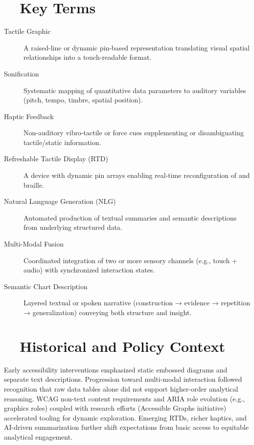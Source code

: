 \section{~~Key Terms}\label{ch13:sec:key-terms}
\begin{description}
	\item[Tactile Graphic] A raised-line or dynamic pin-based representation translating visual spatial relationships into a touch-readable format.
	\item[Sonification] Systematic mapping of quantitative data parameters to auditory variables (pitch, tempo, timbre, spatial position).
	\item[Haptic Feedback] Non-auditory vibro-tactile or force cues supplementing or disambiguating tactile/static information.
	\item[Refreshable Tactile Display (RTD)] A device with dynamic pin arrays enabling real-time reconfiguration of  and braille.
	\item[Natural Language Generation (NLG)] Automated production of textual summaries and semantic descriptions from underlying structured data.
	\item[Multi-Modal Fusion] Coordinated integration of two or more sensory channels (e.g., touch + audio) with synchronized interaction states.
	\item[Semantic Chart Description] Layered textual or spoken narrative (construction → evidence → repetition → generalization) conveying both structure and insight\supercite{VisText}.
\end{description}

\section{~~Historical and Policy Context}\label{ch13:sec:historical-policy}
Early accessibility interventions emphasized static embossed diagrams and separate text descriptions. Progression toward multi-modal interaction followed recognition that raw data tables alone did not support higher-order analytical reasoning\supercite{Lundgard2021, Zewe2021Making}. WCAG non-text content requirements and ARIA role evolution (e.g., graphics roles) coupled with research efforts (Accessible Graphs initiative\supercite{AccessibleGraphs, AccessVizWorkshop}) accelerated tooling for dynamic exploration. Emerging RTDs, richer haptics, and AI-driven summarization further shift expectations from basic access to equitable analytical engagement.

